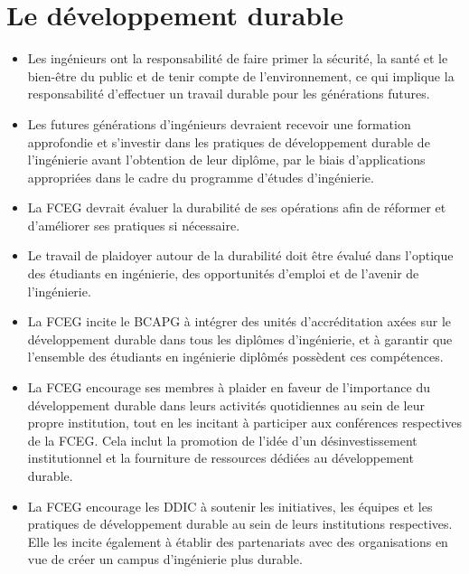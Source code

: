 \section{Le développement durable}\label{le-developpement-durable}



\begin{itemize}
 \item Les ingénieurs ont la responsabilité de faire primer la sécurité, la santé et le bien-être du public et de tenir compte de l'environnement, ce qui implique la responsabilité d'effectuer un travail durable pour les générations futures.
 \item Les futures générations d'ingénieurs devraient recevoir une formation approfondie et s'investir dans les pratiques de développement durable de l'ingénierie avant l'obtention de leur diplôme, par le biais d'applications appropriées dans le cadre du programme d'études d'ingénierie.
 \item La FCEG devrait évaluer la durabilité de ses opérations afin de réformer et d'améliorer ses pratiques si nécessaire.
 \item Le travail de plaidoyer autour de la durabilité doit être évalué dans l'optique des étudiants en ingénierie, des opportunités d'emploi et de l'avenir de l'ingénierie.
\end{itemize}

\begin{itemize}
 \item La FCEG incite le BCAPG à intégrer des unités d'accréditation axées sur le développement durable dans tous les diplômes d'ingénierie, et à garantir que l'ensemble des étudiants en ingénierie diplômés possèdent ces compétences.
 \item La FCEG encourage ses membres à plaider en faveur de l'importance du développement durable dans leurs activités quotidiennes au sein de leur propre institution, tout en les incitant à participer aux conférences respectives de la FCEG. Cela inclut la promotion de l'idée d'un désinvestissement institutionnel et la fourniture de ressources dédiées au développement durable.
 \item La FCEG encourage les DDIC à soutenir les initiatives, les équipes et les pratiques de développement durable au sein de leurs institutions respectives. Elle les incite également à établir des partenariats avec des organisations en vue de créer un campus d'ingénierie plus durable.
\end{itemize}

